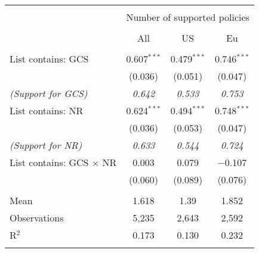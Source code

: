 
\begin{tabular}{@{\extracolsep{5pt}}lccc} 
\\[-1.8ex]\hline 
\hline \\[-1.8ex] 
 & \multicolumn{3}{c}{Number of supported policies} \\ 
\cline{2-4} 
\\[-1.8ex] & All & US & Eu \\ 
\hline \\[-1.8ex] 
 List contains: GCS & 0.607$^{***}$ & 0.479$^{***}$ & 0.746$^{***}$ \\ 
  & (0.036) & (0.051) & (0.047) \\ 
\textit{(Support for GCS)} & \textit{ 0.642 } & \textit{ 0.533 } & \textit{ 0.753 }\\
  List contains: NR & 0.624$^{***}$ & 0.494$^{***}$ & 0.748$^{***}$ \\ 
  & (0.036) & (0.053) & (0.047) \\ 
\textit{(Support for NR)} & \textit{ 0.633 } & \textit{ 0.544 } & \textit{ 0.724 }\\
  List contains: GCS $\times$ NR & 0.003 & 0.079 & $-$0.107 \\ 
  & (0.060) & (0.089) & (0.076) \\ 
 \hline \\[-1.8ex] 
Mean & 1.618 & 1.39 & 1.852 \\ 
Observations & 5,235 & 2,643 & 2,592 \\ 
R$^{2}$ & 0.173 & 0.130 & 0.232 \\ 
\hline 
\hline \\[-1.8ex] 
\end{tabular} 